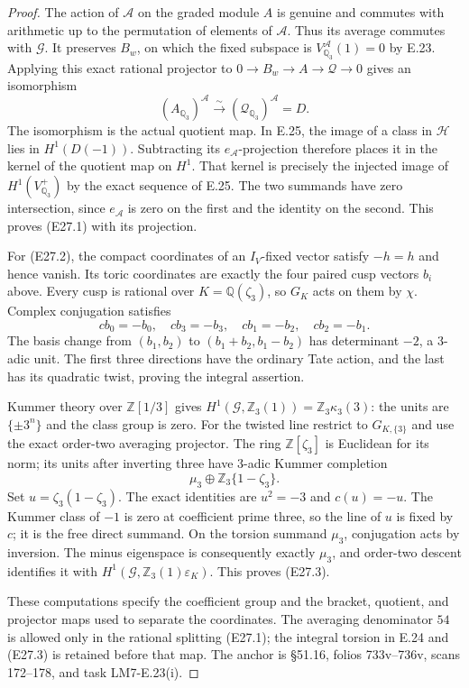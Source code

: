 \begin{proof}
The action of $\mathcal A$ on the graded module $A$ is
genuine and commutes with arithmetic up to the permutation
of elements of $\mathcal A$. Thus its average commutes
with $\mathcal G$. It preserves $B_w$, on which the
fixed subspace is
$V_{\mathbb Q_3}^{\mathcal A}(1)=0$ by E.23.
Applying this exact rational projector to
$0\to B_w\to A\to\mathcal Q\to0$ gives an isomorphism
\[
       (A_{\mathbb Q_3})^{\mathcal A}
                \xrightarrow{\sim}
       (\mathcal Q_{\mathbb Q_3})^{\mathcal A}=D.
\]
The isomorphism is the actual quotient map. In E.25,
the image of a class in $\mathcal H$ lies in $H^1(D(-1))$.
Subtracting its $e_{\mathcal A}$-projection therefore
places it in the kernel of the quotient map on $H^1$.
That kernel is precisely the injected image of
$H^1(V^+_{\mathbb Q_3})$ by the exact sequence of E.25.
The two summands have zero intersection, since
$e_{\mathcal A}$ is zero on the first and the identity
on the second. This proves (E27.1) with its projection.

For (E27.2), the compact coordinates of an
$I_V$-fixed vector satisfy $-h=h$ and hence vanish.
Its toric coordinates are exactly the four paired
cusp vectors $b_i$ above. Every cusp is rational over
$K=\mathbb Q(\zeta_3)$, so $G_K$ acts on them by
$\chi$. Complex conjugation satisfies
\[
 cb_0=-b_0,\quad cb_3=-b_3,\quad
 cb_1=-b_2,\quad cb_2=-b_1.
\]
The basis change from $(b_1,b_2)$ to
$(b_1+b_2,b_1-b_2)$ has determinant $-2$, a
$3$-adic unit. The first three directions have the
ordinary Tate action, and the last has its quadratic
twist, proving the integral assertion.

Kummer theory over $\mathbb Z[1/3]$ gives
$H^1(\mathcal G,\mathbb Z_3(1))=\mathbb Z_3\kappa_3(3)$:
the units are $\{\pm3^n\}$ and the class group is zero.
For the twisted line restrict to $G_{K,\{3\}}$ and use
the exact order-two averaging projector. The ring
$\mathbb Z[\zeta_3]$ is Euclidean for its norm; its
units after inverting three have $3$-adic Kummer
completion
\[
                 \mu_3\oplus\mathbb Z_3\{1-\zeta_3\}.
\]
Set $u=\zeta_3(1-\zeta_3)$. The exact identities are
$u^2=-3$ and $c(u)=-u$. The Kummer class of $-1$
is zero at coefficient prime three, so the line of
$u$ is fixed by $c$; it is the free direct summand.
On the torsion summand $\mu_3$, conjugation acts by
inversion. The minus eigenspace is consequently
exactly $\mu_3$, and order-two descent identifies it
with $H^1(\mathcal G,\mathbb Z_3(1)\varepsilon_K)$.
This proves (E27.3).

These computations specify the coefficient group and
the bracket, quotient, and projector maps used to
separate the coordinates. The averaging denominator
$54$ is allowed only in the rational splitting
(E27.1); the integral torsion in E.24 and (E27.3)
is retained before that map. The anchor is
\S51.16, folios 733v--736v, scans 172--178,
and task LM7-E.23(i).
\end{proof}
